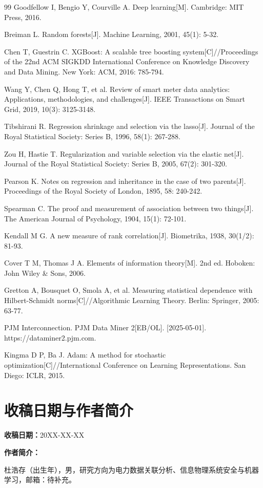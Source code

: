 \documentclass[UTF8,zihao=5,twoside]{ctexart}
\numberwithin{equation}{section}
\begin{document}
\begin{thebibliography}{99}
Goodfellow I, Bengio Y, Courville A. Deep learning[M]. Cambridge: MIT Press, 2016.

Breiman L. Random forests[J]. Machine Learning, 2001, 45(1): 5-32.

Chen T, Guestrin C. XGBoost: A scalable tree boosting system[C]//Proceedings of the 22nd ACM SIGKDD International Conference on Knowledge Discovery and Data Mining. New York: ACM, 2016: 785-794.

Wang Y, Chen Q, Hong T, et al. Review of smart meter data analytics: Applications, methodologies, and challenges[J]. IEEE Transactions on Smart Grid, 2019, 10(3): 3125-3148.

Tibshirani R. Regression shrinkage and selection via the lasso[J]. Journal of the Royal Statistical Society: Series B, 1996, 58(1): 267-288.

Zou H, Hastie T. Regularization and variable selection via the elastic net[J]. Journal of the Royal Statistical Society: Series B, 2005, 67(2): 301-320.

Pearson K. Notes on regression and inheritance in the case of two parents[J]. Proceedings of the Royal Society of London, 1895, 58: 240-242.

Spearman C. The proof and measurement of association between two things[J]. The American Journal of Psychology, 1904, 15(1): 72-101.

Kendall M G. A new measure of rank correlation[J]. Biometrika, 1938, 30(1/2): 81-93.

Cover T M, Thomas J A. Elements of information theory[M]. 2nd ed. Hoboken: John Wiley \& Sons, 2006.

Gretton A, Bousquet O, Smola A, et al. Measuring statistical dependence with Hilbert-Schmidt norms[C]//Algorithmic Learning Theory. Berlin: Springer, 2005: 63-77.

PJM Interconnection. PJM Data Miner 2[EB/OL]. [2025-05-01]. https://dataminer2.pjm.com.

Kingma D P, Ba J. Adam: A method for stochastic optimization[C]//International Conference on Learning Representations. San Diego: ICLR, 2015.
\end{thebibliography}

\section*{收稿日期与作者简介}
\noindent\textbf{收稿日期：}20XX-XX-XX

\noindent\textbf{作者简介：}\par
\noindent 杜浩存（出生年），男，研究方向为电力数据关联分析、信息物理系统安全与机器学习，邮箱：待补充。
\end{document}
